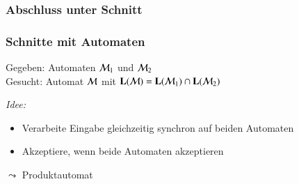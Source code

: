 \documentclass[onlymath]{beamer}
\begin{document}
\begin{frame}\frametitle{Abschluss unter Schnitt}


\end{frame}

\begin{frame}\frametitle{Schnitte mit Automaten}

\alert{Gegeben:} Automaten $\mathcal{M}_1$ und $\mathcal{M}_2$\\[1ex]
\alert{Gesucht:} Automat $\mathcal{M}$ mit $\textbf{\textcolor{black}{L}}(\mathcal{M})=\textbf{\textcolor{black}{L}}(\mathcal{M}_1)\cap\textbf{\textcolor{black}{L}}(\mathcal{M}_2)$
\bigskip

\emph{Idee:}
\begin{itemize}
\item Verarbeite Eingabe gleichzeitig synchron auf beiden Automaten
\item Akzeptiere, wenn beide Automaten akzeptieren
\end{itemize}
$\leadsto$ \alert{Produktautomat}

\end{frame}
\end{document}
